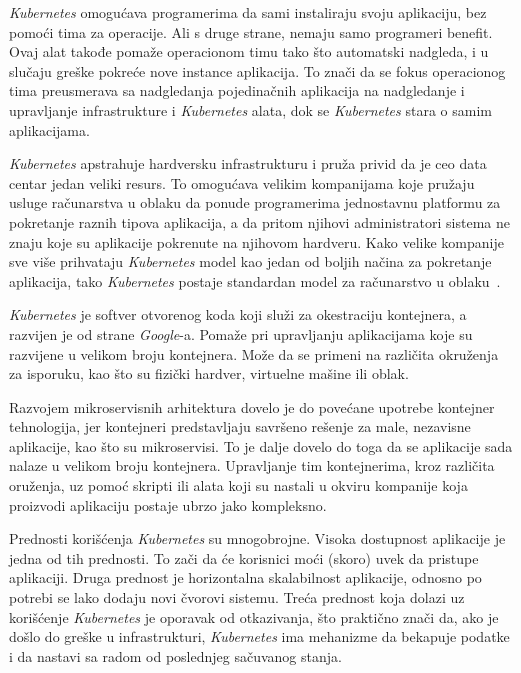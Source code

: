 \textit{Kubernetes} omogućava programerima da sami instaliraju svoju aplikaciju, bez pomoći tima za operacije. Ali s druge 
strane, nemaju samo programeri benefit. Ovaj alat takođe pomaže operacionom timu tako što automatski nadgleda, 
i u slučaju greške pokreće nove instance aplikacija. To znači da se fokus operacionog tima preusmerava sa nadgledanja
pojedinačnih aplikacija na nadgledanje i upravljanje infrastrukture i \textit{Kubernetes} alata, dok se \textit{Kubernetes} stara o samim
aplikacijama.

\textit{Kubernetes} apstrahuje hardversku infrastrukturu i pruža privid da je ceo data centar jedan veliki resurs. To omogućava
velikim kompanijama koje pružaju usluge računarstva u oblaku da ponude programerima jednostavnu platformu za pokretanje
raznih tipova aplikacija, a da pritom njihovi administratori sistema ne znaju koje su aplikacije pokrenute na njihovom
hardveru. Kako velike kompanije sve više prihvataju \textit{Kubernetes} model kao jedan od boljih načina za pokretanje aplikacija,
tako \textit{Kubernetes} postaje standardan model za računarstvo u oblaku~\cite{KIA}.

\textit{Kubernetes} je softver otvorenog koda koji služi za okestraciju kontejnera, a razvijen je od 
strane \textit{Google}-a. Pomaže pri upravljanju aplikacijama koje su razvijene u velikom broju 
kontejnera. Može da se primeni na različita okruženja za isporuku, kao što su fizički 
hardver, virtuelne mašine ili oblak.

Razvojem mikroservisnih arhitektura dovelo je do povećane upotrebe kontejner tehnologija, jer 
kontejneri predstavljaju savršeno rešenje za male, nezavisne aplikacije, kao što su mikroservisi. 
To je dalje dovelo do toga da se aplikacije sada nalaze u velikom broju kontejnera. Upravljanje 
tim kontejnerima, kroz različita oruženja, uz pomoć skripti ili alata koji su nastali u okviru 
kompanije koja proizvodi aplikaciju postaje ubrzo jako kompleksno.

Prednosti korišćenja \textit{Kubernetes} su mnogobrojne. Visoka dostupnost aplikacije je jedna od tih prednosti. 
To zači da će korisnici moći (skoro) uvek da pristupe aplikaciji. Druga prednost je horizontalna 
skalabilnost aplikacije, odnosno po potrebi se lako dodaju novi čvorovi sistemu. Treća prednost koja 
dolazi uz korišćenje \textit{Kubernetes} je oporavak od otkazivanja, što praktično znači da, ako je došlo do 
greške u infrastrukturi, \textit{Kubernetes} ima mehanizme da bekapuje podatke i da nastavi sa radom od 
poslednjeg sačuvanog stanja.

